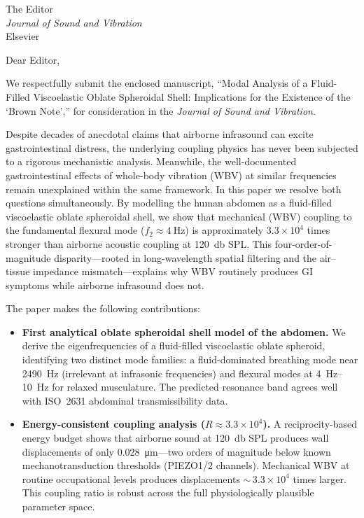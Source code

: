 \documentclass[11pt]{letter}
\begin{document}
\begin{letter}{%
  The Editor\\
  \textit{Journal of Sound and Vibration}\\
  Elsevier}

\opening{Dear Editor,}

We respectfully submit the enclosed manuscript, ``Modal Analysis of a
Fluid-Filled Viscoelastic Oblate Spheroidal Shell: Implications for the
Existence of the `Brown Note','' for consideration in the
\textit{Journal of Sound and Vibration}.

Despite decades of anecdotal claims that airborne infrasound can excite
gastrointestinal distress, the underlying coupling physics has never been
subjected to a rigorous mechanistic analysis.  Meanwhile, the well-documented
gastrointestinal effects of whole-body vibration (WBV) at similar frequencies
remain unexplained within the same framework.  In this paper we resolve both
questions simultaneously.  By modelling the human abdomen as a fluid-filled
viscoelastic oblate spheroidal shell, we show that mechanical (WBV) coupling
to the fundamental flexural mode ($f_2 \approx \SI{4}{\hertz}$) is
approximately $3.3 \times 10^4$ times stronger than airborne acoustic coupling at
\SI{120}{\decibel} SPL.  This four-order-of-magnitude disparity---rooted in
long-wavelength spatial filtering and the air--tissue impedance
mismatch---explains why WBV routinely
produces GI symptoms while airborne infrasound does not.

The paper makes the following contributions:

\begin{itemize}
  \item \textbf{First analytical oblate spheroidal shell model of the abdomen.}
    We derive the eigenfrequencies of a fluid-filled viscoelastic oblate
    spheroid, identifying two distinct mode families: a fluid-dominated
    breathing mode near \SI{2490}{\hertz} (irrelevant at infrasonic frequencies)
    and flexural modes at \SIrange{4}{10}{\hertz} for relaxed musculature.
    The predicted resonance band agrees well with ISO~2631 abdominal
    transmissibility data.

  \item \textbf{Energy-consistent coupling analysis ($R \approx 3.3 \times 10^4$).}
    A reciprocity-based energy budget shows that airborne sound at
    \SI{120}{\decibel} SPL produces wall displacements of only
    \SI{0.028}{\micro\metre}---two orders of magnitude below known
    mechanotransduction thresholds (PIEZO1/2 channels).  Mechanical WBV at
    routine occupational levels produces displacements ${\sim}\,3.3 \times 10^4$ times
    larger.  This coupling ratio is robust across the full physiologically
    plausible parameter space.


\end{itemize}
\end{letter}
\end{document}
